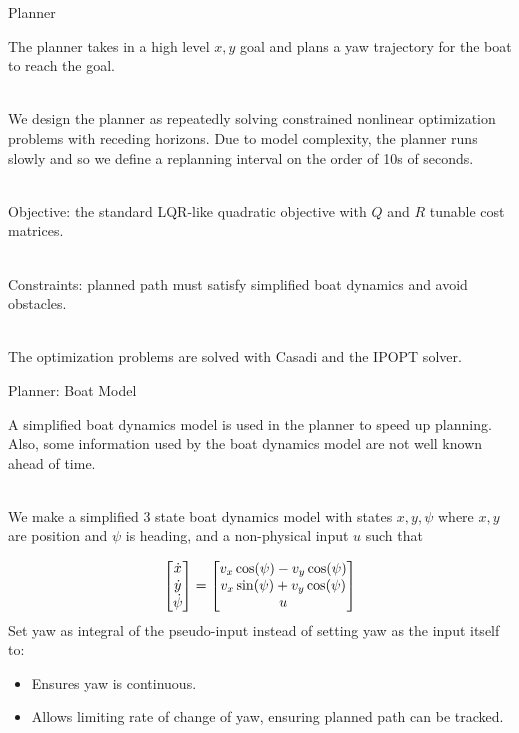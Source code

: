 \documentclass[10pt,xcolor={table,dvipsnames},t]{beamer}
\begin{document}
\begin{frame}{Planner}
    
    The planner takes in a high level \(x, y\) goal and plans a yaw trajectory for the boat 
    to reach the goal.
    
    \hfill\\
    We design the planner as repeatedly solving constrained nonlinear optimization problems with receding horizons. Due to model complexity, the planner runs slowly and so we define a 
    replanning interval on the order of 10s of seconds.
    
    \hfill\\
    Objective: the standard LQR-like quadratic objective with \(Q\) and \(R\) tunable cost matrices.
    
    \hfill\\
    Constraints: planned path must satisfy simplified boat dynamics and avoid obstacles.
    
    \hfill\\
    The optimization problems are solved with Casadi and the IPOPT solver.
    
\end{frame}

\begin{frame}{Planner: Boat Model}

    A simplified boat dynamics model is used in the planner to speed up planning.
    Also, some information used by the boat dynamics model are not well known 
    ahead of time.
    
    \hfill\\
    We make a simplified 3 state boat dynamics model with states \(x, y, \psi\) where 
    \(x, y\) are position and \(\psi\) is heading, and a non-physical input \(u\) 
    such that 
    
    \begin{equation}
        \mqty[\dot{x} \\ \dot{y} \\ \dot{\psi}]
         = \mqty[v_x \cos(\psi) - v_y \cos(\psi) \\ 
         v_x \sin(\psi) + v_y\cos(\psi) \\ 
         u]
    \end{equation}
    Set yaw as integral of the pseudo-input instead of setting yaw as the input itself to:
    \begin{itemize}
        \item Ensures yaw is continuous.
        \item Allows limiting rate of change of yaw, ensuring planned path can be tracked.
    \end{itemize}

\end{frame}
\end{document}
